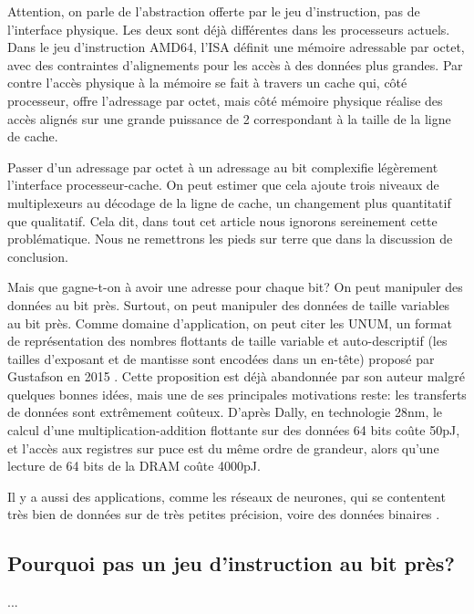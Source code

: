 \documentclass[architecture]{compas2018}
\begin{document}
Attention, on parle de l'abstraction offerte par le jeu d'instruction, pas de l'interface physique.
Les deux sont déjà différentes dans les processeurs actuels.
Dans le jeu d'instruction AMD64, l'ISA définit une mémoire adressable par octet, avec des contraintes d'alignements pour les accès à des données plus grandes.
Par contre l'accès physique à la mémoire se fait à travers un cache qui, côté processeur, offre l'adressage par octet, mais côté mémoire physique  réalise des accès alignés sur une grande puissance de 2 correspondant à la taille de la ligne de cache.

Passer d'un adressage par octet à un adressage au bit complexifie légèrement l'interface processeur-cache.
On peut estimer que cela ajoute trois niveaux de multiplexeurs au décodage de la ligne de cache, un changement plus quantitatif que qualitatif.
Cela dit, dans tout cet article nous ignorons sereinement cette problématique.
Nous ne remettrons les pieds sur terre que dans la discussion de conclusion.


Mais que gagne-t-on à avoir une adresse pour chaque bit?  On peut manipuler des données au bit près.
Surtout, on peut manipuler des données de taille variables au bit près.
Comme domaine d'application, on peut citer les UNUM, un format de représentation des nombres flottants de taille variable et auto-descriptif (les tailles d'exposant et de mantisse sont encodées dans un en-tête) proposé par  Gustafson en 2015 \cite{2015-02-GUSTAFSON}.
Cette proposition est déjà abandonnée par son auteur \cite{2016-09-TICHY} malgré quelques bonnes idées, mais une de ses principales motivations reste: les transferts de données sont extrêmement coûteux.
D'après Dally, en technologie 28nm, le calcul d'une multiplication-addition flottante sur des données 64 bits coûte 50pJ, et l'accès aux registres sur puce est du même ordre de grandeur, alors qu'une lecture de 64 bits de la DRAM coûte 4000pJ.

Il y a aussi des applications, comme les réseaux de neurones, qui se contentent très bien de données sur de très petites précision, voire des données binaires \cite{AndriCRB16,AlemdarEtAl2017:TernaryCNN,AmiriEtAl2018:mixedPrecCNN,Preusser:DATE2018:heteroCNN}. 

\subsection{Pourquoi pas un jeu d'instruction au bit près?}

...
\end{document}
